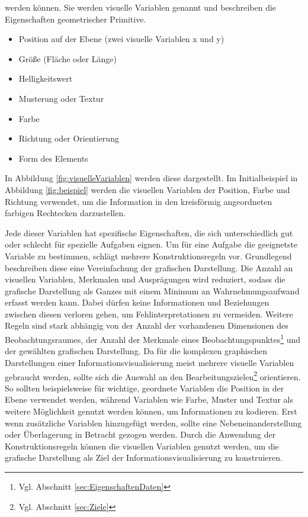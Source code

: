\documentclass[a4paper, 12pt, DIV=calc, version=first, pdftex, headsepline, footsepline, bibtotocnumbered, liststotocnumbered]{scrreprt}
\begin{document}
werden können. Sie werden visuelle Variablen genannt und beschreiben die Eigenschaften geometrischer Primitive.
\begin{itemize}
\item Position auf der Ebene (zwei visuelle Variablen x und y)
\item Größe (Fläche oder Länge)
\item Helligkeitswert
\item Musterung oder Textur
\item Farbe
\item Richtung oder Orientierung
\item Form des Elements
\end{itemize}
In Abbildung \ref{fig:visuelleVariablen} werden diese dargestellt. Im Initialbeispiel in Abbildung
\ref{fig:beispiel} werden die visuellen Variablen der Position, Farbe und Richtung verwendet,
um die Information in den kreisförmig angeordneten farbigen Rechtecken darzustellen.

Jede dieser Variablen hat spezifische Eigenschaften, die sich unterschiedlich gut oder schlecht
für spezielle Aufgaben eignen. Um für eine Aufgabe die geeignetste Variable zu bestimmen, schlägt
\citep{Bertin} mehrere Konstruktionsregeln vor.
Grundlegend beschreiben diese eine Vereinfachung der grafischen Darstellung.
Die Anzahl an visuellen Variablen, Merkmalen und Ausprägungen wird reduziert,
sodass die grafische Darstellung als Ganzes mit einem Minimum an Wahrnehmungsaufwand erfasst werden kann.
Dabei dürfen keine Informationen und Beziehungen zwischen diesen verloren gehen, um Fehlinterpretationen
zu vermeiden. Weitere Regeln sind stark abhängig von der Anzahl
der vorhandenen Dimensionen des Beobachtungsraumes, der Anzahl der Merkmale eines
Beobachtungspunktes\footnote{Vgl. Abschnitt \ref{sec:EigenschaftenDaten}} und der gewählten
grafischen Darstellung. Da für die komplexen graphischen Darstellungen einer 
Informationsvisualisierung meist mehrere visuelle Variablen gebraucht werden, sollte sich die Auswahl
an den Bearbeitungszielen\footnote{Vgl. Abschnitt \ref{sec:Ziele}} orientieren.
So sollten beispielsweise für wichtige, geordnete Variablen die Position in der Ebene verwendet werden,
während Variablen wie Farbe, Muster und Textur als weitere Möglichkeit genutzt werden können, um Informationen zu kodieren.
Erst wenn zusätzliche Variablen hinzugefügt werden, sollte eine Nebeneinanderstellung oder
Überlagerung in Betracht gezogen werden.
Durch die Anwendung der Konstruktionsregeln können die visuellen Variablen genutzt werden, um
die grafische Darstellung als Ziel der Informationsvisualisierung zu konstruieren.
\end{document}
